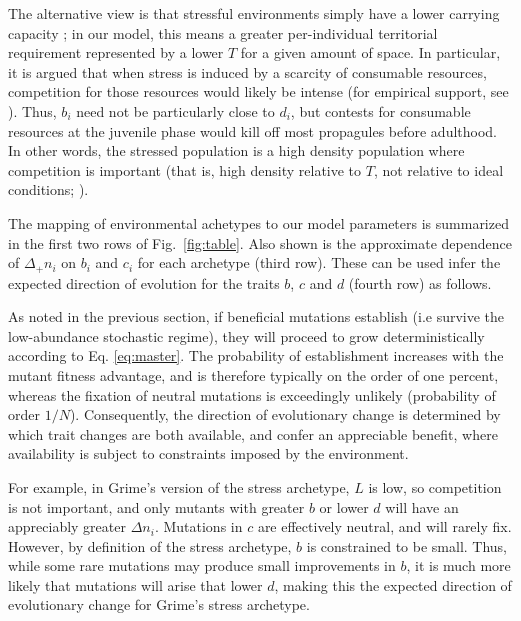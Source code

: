 \documentclass[11pt]{article}
\begin{document}
The alternative view is that stressful environments simply have a lower carrying capacity \citep{taylor_1990}; in our model, this means a greater per-individual territorial requirement represented by a lower $T$ for a given amount of space. In particular, it is argued that when stress is induced by a scarcity of consumable resources, competition for those resources would likely be intense (for empirical support, see \citealt{davis_1998}). Thus, $b_i$ need not be particularly close to $d_i$, but contests for consumable resources at the juvenile phase would kill off most propagules before adulthood. In other words, the stressed population is a high density population where competition is important (that is, high density relative to $T$, not relative to ideal conditions; \citealt{taylor_1990}). 

The mapping of environmental achetypes to our model parameters is summarized in the first two rows of Fig.~\ref{fig:table}. Also shown is the approximate dependence of $\Delta_+ n_i$ on $b_i$ and $c_i$ for each archetype (third row). These can be used infer the expected direction of evolution for the traits $b$, $c$ and $d$ (fourth row) as follows. 

As noted in the previous section, if beneficial mutations establish (i.e survive the low-abundance stochastic regime), they will proceed to grow deterministically according to Eq. \eqref{eq:master}. The probability of establishment increases with the mutant fitness advantage, and is therefore typically on the order of one percent, whereas the fixation of neutral mutations is exceedingly unlikely (probability of order $1/N$). Consequently, the direction of evolutionary change is determined by which trait changes are both available, and confer an appreciable benefit, where availability is subject to constraints imposed by the environment. 

For example, in Grime's version of the stress archetype, $L$ is low, so competition is not important, and only mutants with greater $b$ or lower $d$ will have an appreciably greater $\Delta n_i$. Mutations in $c$ are effectively neutral, and will rarely fix. However, by definition of the stress archetype, $b$ is constrained to be small. Thus, while some rare mutations may produce small improvements in $b$, it is much more likely that mutations will arise that lower $d$, making this the expected direction of evolutionary change for Grime's stress archetype. 
\end{document}
